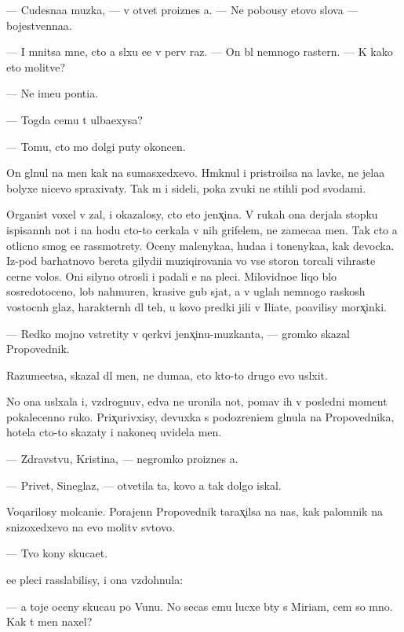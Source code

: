 \documentclass[10pt]{book}
\begin{document}
— Cudesna{\y}a muz{\yi}ka, — v otvet pro{\y}iznes {\y}a. — Ne pobo{\y}usy etovo slova — bojestvenna{\y}a.

— I mnitsa mne, cto {\y}a sl{\yi}xu {\y}e{\y}e v perv{\yi}{\y} raz. — On b{\yi}l nemnogo raster{\ia}n. — K kako{\y} eto molitve?

— Ne ime{\y}u pon{\ia}ti{\y}a.

— Togda cemu t{\yi} ul{\yi}ba{\y}exysa?

— Tomu, cto mo{\y} dolgi{\y} puty okoncen.

On gl{\ia}nul na men{\ia} kak na sumasxedxevo. Hm{\yi}knul i pristro{\y}ilsa na lavke, ne jela{\y}a bolyxe nicevo spraxivaty. Tak m{\yi} i sideli, poka zvuki ne stihli pod svodami.

Organist voxel v zal, i okazalosy, cto eto jenx̨ina. V rukah ona derjala stopku ispisann{\yi}h not i na hodu cto-to cerkala v nih grifelem, ne zameca{\y}a men{\ia}. Tak cto {\y}a otlicno smog {\y}e{\y}e rassmotrety. Oceny malenyka{\y}a, huda{\y}a i tonenyka{\y}a, kak devocka. Iz-pod barhatnovo bereta gilydi{\y}i muziqirovani{\y}a vo vse storon{\yi} torcali vihrast{\yi}{\y}e cern{\yi}{\y}e volos{\yi}. Oni silyno otrosli i padali {\y}e{\y} na pleci. Milovidno{\y}e liqo b{\yi}lo sosredotoceno, lob nahmuren, krasiv{\yi}{\y}e gub{\yi} sjat{\yi}, a v uglah nemnogo raskos{\yi}h vostocn{\yi}h glaz, haraktern{\yi}h dl{\ia} teh, u kovo predki jili v Iliate, po{\y}avilisy morx̨inki.

— Redko mojno vstretity v qerkvi jenx̨inu-muz{\yi}kanta, — gromko skazal Propovednik.

Razume{\y}etsa, skazal dl{\ia} men{\ia}, ne duma{\y}a, cto kto-to drugo{\y} {\y}evo usl{\yi}xit.

No ona usl{\yi}xala i, vzdrognuv, {\y}edva ne uronila not{\yi}, po{\y}mav ih v posledni{\y} moment pokalecenno{\y} ruko{\y}. Prix̨urivxisy, devuxka s podozreni{\y}em gl{\ia}nula na Propovednika, hotela cto-to skazaty i nakoneq uvidela men{\ia}.

— Zdravstvu{\y}, Kristina, — negromko pro{\y}iznes {\y}a.

— Privet, Sineglaz{\yi}{\y}, — otvetila ta, kovo {\y}a tak dolgo iskal.

Voqarilosy molcani{\y}e. Porajenn{\yi}{\y} Propovednik tarax̨ilsa na nas, kak palomnik na snizoxedxevo na {\y}evo molitv{\yi} sv{\ia}tovo.

— Tvo{\y} kony skuca{\y}et.

{\Y}ee pleci rasslabilisy, i ona vzdohnula:

— {\Y}a toje oceny skuca{\y}u po V{\y}unu. No se{\y}cas {\y}emu lucxe b{\yi}ty s Miriam, cem so mno{\y}. Kak t{\yi} men{\ia} naxel?
\end{document}
